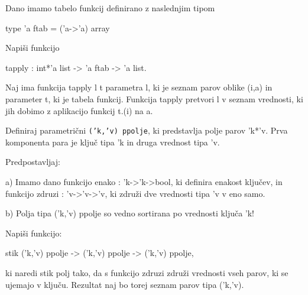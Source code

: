 \begin{ex}
  Dano imamo tabelo funkcij definirano z naslednjim tipom

  type 'a ftab = ('a->'a) array

  Napi\v si funkcijo

  tapply : int*'a list -> 'a ftab -> 'a list.

  Naj ima funkcija tapply l t parametra l, ki je seznam parov oblike
  (i,a) in parameter t, ki je tabela funkcij. Funkcija tapply pretvori
  l v seznam vrednosti, ki jih dobimo z aplikacijo funkcij t.(i) na a.


\end{ex} 
\begin{ex}
  Definiraj parametri\v cni \texttt{('k,'v) ppolje}, ki predstavlja
  polje parov 'k*'v. Prva komponenta para je klju\v c tipa 'k in druga
  vrednost tipa 'v.

  \noindent\/Predpostavljaj:

  a) Imamo dano funkcijo enako : 'k->'k->bool, ki definira enakost
  klju\v cev, in funkcijo zdruzi : 'v->'v->'v, ki zdru\v zi dve
  vrednosti tipa 'v v eno samo.

  b) Polja tipa ('k,'v) ppolje so vedno sortirana po vrednosti klju\v
  ca 'k!

  Napi\v si funkcijo:

  stik ('k,'v) ppolje -> ('k,'v) ppolje -> ('k,'v) ppolje,

  ki naredi stik polj tako, da s funkcijo zdruzi zdru\v zi vrednosti
  vseh parov, ki se ujemajo v klju\v cu. Rezultat naj bo torej seznam
  parov tipa ('k,'v).


\end{ex}
